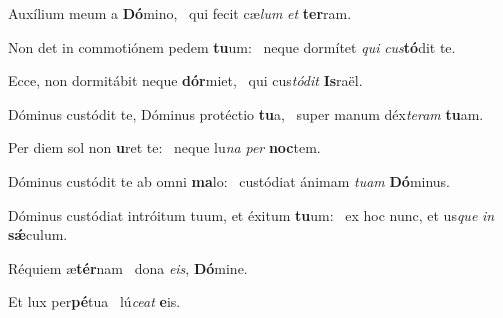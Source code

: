 \item Auxílium meum a \textbf{Dó}mino,~\psstar{} qui fecit cæ\textit{lum} \textit{et} \textbf{ter}ram.

\item Non det in commotiónem pedem \textbf{tu}um:~\psstar{} neque dormítet \textit{qui} \textit{cus}\textbf{tó}dit te.

\item Ecce, non dormitábit neque \textbf{dór}miet,~\psstar{} qui cus\textit{tó}\textit{dit} \textbf{Is}raël.

\item Dóminus custódit te, Dóminus protéctio \textbf{tu}a,~\psstar{} super manum déx\textit{te}\textit{ram} \textbf{tu}am.

\item Per diem sol non \textbf{u}ret te:~\psstar{} neque lu\textit{na} \textit{per} \textbf{noc}tem.

\item Dóminus custódit te ab omni \textbf{ma}lo:~\psstar{} custódiat ánimam \textit{tu}\textit{am} \textbf{Dó}minus.

\item Dóminus custódiat intróitum tuum, et éxitum \textbf{tu}um:~\psstar{} ex hoc nunc, et us\textit{que} \textit{in} \textbf{sǽ}culum.

\item Réquiem æ\textbf{tér}nam~\psstar{} dona \textit{e}\textit{is}, \textbf{Dó}mine.

\item Et lux per\textbf{pé}tua~\psstar{} lú\textit{ce}\textit{at} \textbf{e}is.
